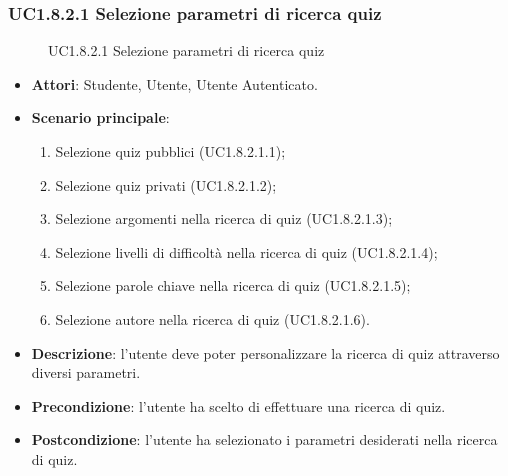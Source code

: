 \subsubsection{UC1.8.2.1 Selezione parametri di ricerca quiz}
\begin{figure}[H]
\centering
\noindent{}
\caption{UC1.8.2.1 Selezione parametri di ricerca quiz}
\end{figure}
\begin{itemize}
\item \textbf{Attori}: Studente, Utente, Utente Autenticato.
\item \textbf{Scenario principale}:
\begin{enumerate}
\item Selezione quiz pubblici (UC1.8.2.1.1);
\item Selezione quiz privati (UC1.8.2.1.2);
\item Selezione argomenti nella ricerca di quiz (UC1.8.2.1.3);
\item Selezione livelli di difficoltà nella ricerca di quiz (UC1.8.2.1.4);
\item Selezione parole chiave nella ricerca di quiz (UC1.8.2.1.5);
\item Selezione autore nella ricerca di quiz (UC1.8.2.1.6).
\end{enumerate}
\item \textbf{Descrizione}: l'utente deve poter personalizzare la ricerca di quiz attraverso diversi parametri.
\item \textbf{Precondizione}: l'utente ha scelto di effettuare una ricerca di quiz.
\item \textbf{Postcondizione}: l'utente ha selezionato i parametri desiderati nella ricerca di quiz.
\end{itemize}
